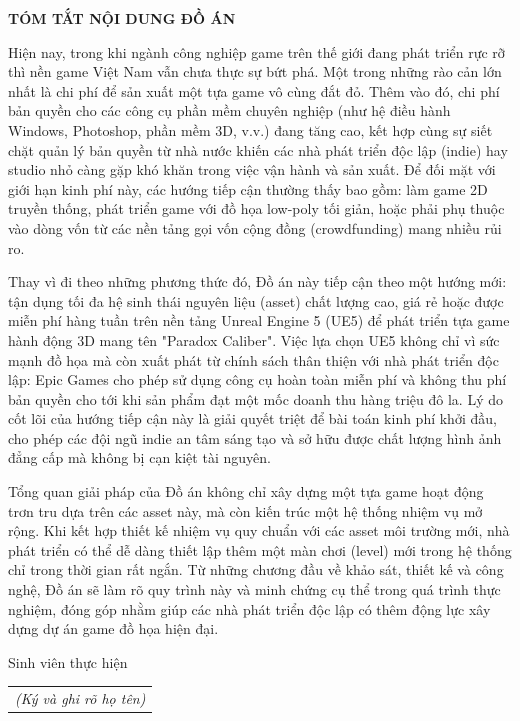 \documentclass[../DoAn.tex]{subfiles}
\begin{document}
\begin{center}
    \Large{\textbf{TÓM TẮT NỘI DUNG ĐỒ ÁN}}\\
\end{center}
\vspace{1cm}
\hspace{\parindent}Hiện nay, trong khi ngành công nghiệp game trên thế giới đang phát triển rực rỡ thì nền game Việt Nam vẫn chưa thực sự bứt phá. Một trong những rào cản lớn nhất là chi phí để sản xuất một tựa game vô cùng đắt đỏ. Thêm vào đó, chi phí bản quyền cho các công cụ phần mềm chuyên nghiệp (như hệ điều hành Windows, Photoshop, phần mềm 3D, v.v.) đang tăng cao, kết hợp cùng sự siết chặt quản lý bản quyền từ nhà nước khiến các nhà phát triển độc lập (indie) hay studio nhỏ càng gặp khó khăn trong việc vận hành và sản xuất. Để đối mặt với giới hạn kinh phí này, các hướng tiếp cận thường thấy bao gồm: làm game 2D truyền thống, phát triển game với đồ họa low-poly tối giản, hoặc phải phụ thuộc vào dòng vốn từ các nền tảng gọi vốn cộng đồng (crowdfunding) mang nhiều rủi ro.

Thay vì đi theo những phương thức đó, Đồ án này tiếp cận theo một hướng mới: tận dụng tối đa hệ sinh thái nguyên liệu (asset) chất lượng cao, giá rẻ hoặc được miễn phí hàng tuần trên nền tảng Unreal Engine 5 (UE5) để phát triển tựa game hành động 3D mang tên "Paradox Caliber". Việc lựa chọn UE5 không chỉ vì sức mạnh đồ họa mà còn xuất phát từ chính sách thân thiện với nhà phát triển độc lập: Epic Games cho phép sử dụng công cụ hoàn toàn miễn phí và không thu phí bản quyền cho tới khi sản phẩm đạt một mốc doanh thu hàng triệu đô la. Lý do cốt lõi của hướng tiếp cận này là giải quyết triệt để bài toán kinh phí khởi đầu, cho phép các đội ngũ indie an tâm sáng tạo và sở hữu được chất lượng hình ảnh đẳng cấp mà không bị cạn kiệt tài nguyên.

Tổng quan giải pháp của Đồ án không chỉ xây dựng một tựa game hoạt động trơn tru dựa trên các asset này, mà còn kiến trúc một hệ thống nhiệm vụ mở rộng. Khi kết hợp thiết kế nhiệm vụ quy chuẩn với các asset môi trường mới, nhà phát triển có thể dễ dàng thiết lập thêm một màn chơi (level) mới trong hệ thống chỉ trong thời gian rất ngắn. Từ những chương đầu về khảo sát, thiết kế và công nghệ, Đồ án sẽ làm rõ quy trình này và minh chứng cụ thể trong quá trình thực nghiệm, đóng góp nhằm giúp các nhà phát triển độc lập có thêm động lực xây dựng dự án game đồ họa hiện đại.

\begin{flushright}
Sinh viên thực hiện\\
\begin{tabular}{@{}c@{}}
\textit{(Ký và ghi rõ họ tên)}
\end{tabular}
\end{flushright}
\end{document}
